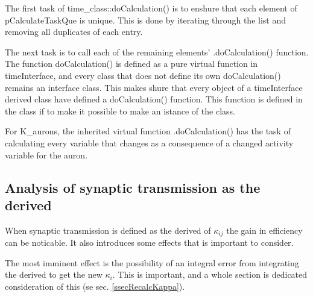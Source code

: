 			The first task of time\_class::doCalculation() is to enshure that each element of pCalculateTaskQue is unique. 
			This is done by iterating through the list and removing all duplicates of each entry.
			
			The next task is to call each of the remaining elements' .doCalculation() function.
			The function doCalculation() is defined as a pure virtual function in timeInterface, and every class that does not define its own doCalculation() remains an interface class.
			This makes shure that every object of a timeInterface derived class have defined a doCalculation() function. This function is defined in the class if to make it possible to make an istance of the class.

			For K\_aurons, the inherited virtual function .doCalculation() has the task of calculating every variable that changes as a consequence of a changed activity variable for the auron.

			\subsection{Analysis of synaptic transmission as the derived}
			When synaptic transmission is defined as the derived of $\kappa_{ij}$ the gain in efficiency can be noticable. 
			It also introduces some effects that is important to consider. 

			The most imminent effect is the possibility of an integral error from integrating the derived to get the new $\kappa_i$. 
			This is important, and a whole section is dedicated consideration of this (se sec. \ref{ssecRecalcKappa}).



